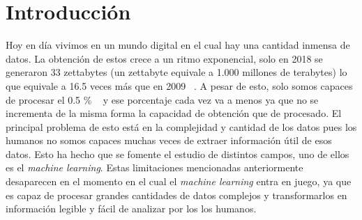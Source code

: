 \documentclass[a4paper, 12pt]{book}
\begin{document}


\tableofcontents 
\cleardoublepage
\listoffigures %



\cleardoublepage
\chapter{Introducción}
\label{sec:intro} %

Hoy en día vivimos en un mundo digital en el cual hay una cantidad inmensa de datos. La obtención de estos crece a un ritmo exponencial, solo en 2018 se generaron 33 zettabytes (un zettabyte equivale a 1.000 millones de terabytes) lo que equivale a 16.5 veces más que en 2009 ~\cite{webstatista}. A pesar de esto, solo somos capaces de procesar el 0.5 \% ~\cite{machinelearning} y ese porcentaje cada vez va a menos ya que no se incrementa de la misma forma la capacidad de obtención que de procesado. El principal problema de esto está en la complejidad y cantidad de los datos pues los humanos no somos capaces muchas veces de extraer información útil de esos datos. Esto ha hecho que se fomente el estudio de distintos campos, uno de ellos es el \emph{machine learning}. Estas limitaciones mencionadas anteriormente desaparecen en el momento en el cual el \emph{machine learning} entra en juego, ya que es capaz de procesar grandes cantidades de datos complejos y transformarlos en información legible y fácil de analizar por los los humanos.
\end{document}

